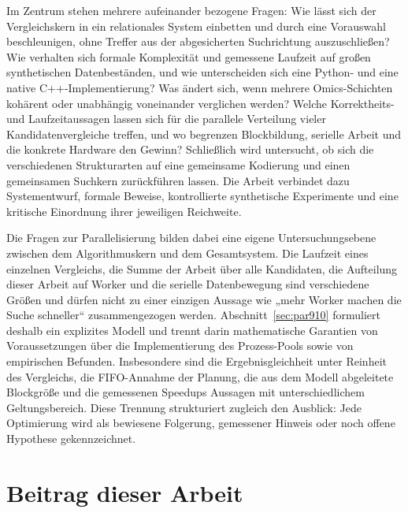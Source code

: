 \documentclass[a4paper,12pt, twoside]{report}
\theoremstyle{definition}
\begin{document}
Im Zentrum stehen mehrere aufeinander bezogene Fragen: Wie lässt sich der Vergleichskern in ein relationales System einbetten und durch eine Vorauswahl beschleunigen, ohne Treffer aus der abgesicherten Suchrichtung auszuschließen? Wie verhalten sich formale Komplexität und gemessene Laufzeit auf großen synthetischen Datenbeständen, und wie unterscheiden sich eine Python- und eine native C++-Implementierung? Was ändert sich, wenn mehrere Omics-Schichten kohärent oder unabhängig voneinander verglichen werden? Welche Korrektheits- und Laufzeitaussagen lassen sich für die parallele Verteilung vieler Kandidatenvergleiche treffen, und wo begrenzen Blockbildung, serielle Arbeit und die konkrete Hardware den Gewinn? Schließlich wird untersucht, ob sich die verschiedenen Strukturarten auf eine gemeinsame Kodierung und einen gemeinsamen Suchkern zurückführen lassen. Die Arbeit verbindet dazu Systementwurf, formale Beweise, kontrollierte synthetische Experimente und eine kritische Einordnung ihrer jeweiligen Reichweite.

Die Fragen zur Parallelisierung bilden dabei eine eigene Untersuchungsebene zwischen dem Algorithmuskern und dem Gesamtsystem. Die Laufzeit eines einzelnen Vergleichs, die Summe der Arbeit über alle Kandidaten, die Aufteilung dieser Arbeit auf Worker und die serielle Datenbewegung sind verschiedene Größen und dürfen nicht zu einer einzigen Aussage wie „mehr Worker machen die Suche schneller“ zusammengezogen werden. Abschnitt~\ref{sec:par910} formuliert deshalb ein explizites Modell und trennt darin mathematische Garantien von Voraussetzungen über die Implementierung des Prozess-Pools sowie von empirischen Befunden. Insbesondere sind die Ergebnisgleichheit unter Reinheit des Vergleichs, die FIFO-Annahme der Planung, die aus dem Modell abgeleitete Blockgröße und die gemessenen Speedups Aussagen mit unterschiedlichem Geltungsbereich. Diese Trennung strukturiert zugleich den Ausblick: Jede Optimierung wird als bewiesene Folgerung, gemessener Hinweis oder noch offene Hypothese gekennzeichnet.

\section{Beitrag dieser Arbeit}
\end{document}
